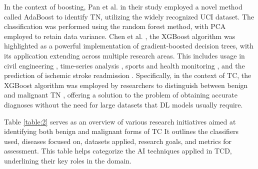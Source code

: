 \documentclass[a4paper,fleqn]{cas-sc}
\begin{document}
In the context of boosting, Pan et al. in their study \cite{pan2016improved} employed a novel method called AdaBoost to identify \ac{TN}, utilizing the widely recognized UCI dataset. The classification was performed using the random forest method, with \ac{PCA} employed to retain data variance. Chen et al. \cite{chen2016xgboost}, the \ac{XGBoost} algorithm was highlighted as a powerful implementation of gradient-boosted decision trees, with its application extending across multiple research areas. This includes usage in civil engineering \cite{lim2019xgboost}, time-series analysis \cite{ji2019xg}, sports and health monitoring \cite{guo2019xgboost}, and the prediction of ischemic stroke readmission \cite{xu2019extreme}. Specifically, in the context of TC, the \ac{XGBoost} algorithm was employed by researchers to distinguish between benign and malignant \ac{TN} \cite{chen2020computer}, offering a solution to the problem of obtaining accurate diagnoses without the need for large datasets that \ac{DL} models usually require.

Table \ref{table:2} serves as an overview of various research initiatives aimed at identifying both benign and malignant forms of TC It outlines the classifiers used, diseases focused on, datasets applied, research goals, and metrics for assessment. This table helps categorize the \ac{AI} techniques applied in \ac{TCD}, underlining their key roles in the domain.
\end{document}
